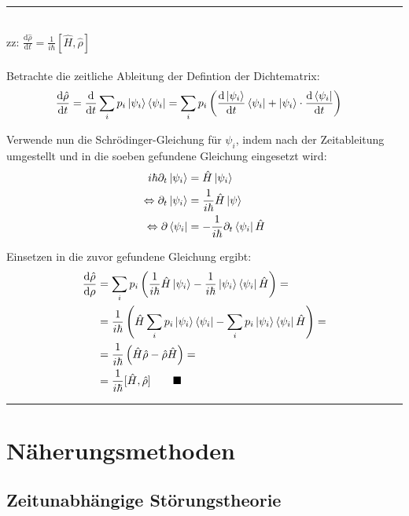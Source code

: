 \documentclass{article}
\newcommand{\diff}{\mathrm{d}}
\newcommand{\lr}[1]{\left(#1\right)}
\begin{document}
\newpage


{\color{violet}
\hrule
	\\
	zz: $\frac{\diff\hat{\rho}}{\diff t} = \frac{1}{i\hbar} [\hat{H}, \hat{\rho}]$\\
	\\
	Betrachte die zeitliche Ableitung der Defintion der Dichtematrix:
		\begin{align*}
			\frac{\diff \hat{\rho}}{\diff t} &= \frac{\diff}{\diff t} \sum_i p_i \ket{\psi_i}\bra{\psi_i} = \sum_i p_i \lr{ \frac{\diff\ket{\psi_i}}{\diff t} \bra{\psi_i} + \ket{\psi_i} \cdot \frac{\diff\bra{\psi_i}}{\diff t} }
		\end{align*}

	Verwende nun die Schrödinger-Gleichung für $\psi_i$, indem nach der Zeitableitung umgestellt und in die soeben gefundene Gleichung eingesetzt wird:
		\begin{align*}
			i\hbar\partial_t \ket{\psi_i} &= \hat{H}\ket{\psi_i} \\
			\Leftrightarrow \partial_t \ket{\psi_i} &= \frac{1}{i\hbar} \hat{H} \ket{\psi} \\
			\Leftrightarrow \partial \bra{\psi_i} &= -\frac{1}{i\hbar} \partial_t \bra{\psi_i} \hat{H}
		\end{align*}

	Einsetzen in die zuvor gefundene Gleichung ergibt:
		\begin{align*}
			\frac{\diff\hat{\rho}}{\diff\rho} &= \sum_i p_i \lr{ \frac{1}{i\hbar}\hat{H} \ket{\psi_i} - \frac{1}{i\hbar} \ket{\psi_i} \bra{\psi_i} \hat{H} } = \\
			&= \frac{1}{i\hbar} \lr{ \hat{H} \sum_i p_i \ket{\psi_i} \bra{\psi_i} - \sum_i p_i  \ket{\psi_i} \bra{\psi_i} \hat{H} } = \\
			&= \frac{1}{i\hbar} \lr{ \hat{H} \hat{\rho} - \hat{\rho} \hat{H} } = \\
			&= \frac{1}{i\hbar} [\hat{H},\hat{\rho}] \qquad\blacksquare
		\end{align*}

\hrule
}


\newpage


\section{Näherungsmethoden}
\subsection{Zeitunabhängige Störungstheorie}
\end{document}
